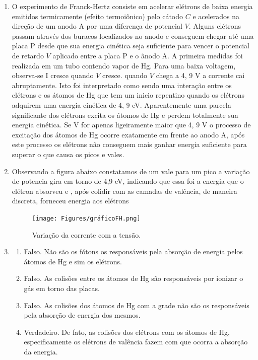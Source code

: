 \documentclass[12pt,a4paper]{article}
\begin{document}
\begin{enumerate}[label = \alph*)]
    \item O experimento de Franck-Hertz consiste em acelerar elétrons
    de baixa energia emitidos termicamente (efeito termoiônico) pelo
    cátodo $C$ e acelerados na direção de um anodo A por uma diferença de potencial $V$. Alguns elétrons passam através dos buracos
    localizados no anodo e conseguem chegar até uma placa P desde
    que sua energia cinética seja suficiente para vencer o potencial de
    retardo $V$ aplicado entre a placa P e o ânodo A. A primeira medidas foi realizada em um tubo contendo vapor de Hg. Para uma baixa voltagem, observa-se I cresce quando $V$ cresce. quando $V$ chega a 4, 9 V a corrente cai abruptamente.
    Isto foi interpretado como sendo uma interação entre os elétrons
    e os átomos de Hg que tem um inicio repentino quando os elétrons adquirem uma energia cinética de 4, 9 eV. Aparentemente
    uma parcela significante dos elétrons excita os átomos de Hg e
    perdem totalmente sua energia cinética. Se V for apenas ligeiramente maior que 4, 9 V o processo de excitação dos átomos de Hg ocorre exatamente em frente ao anodo A, após este processo os elétrons não conseguem mais ganhar energia suficiente para superar o que causa os picos e vales.
    \item Observando a figura abaixo constatamos de um vale para um pico a variação de potencia gira em torno de 4,9 eV, indicando que essa foi a energia que o elétron absorveu e , após colidir com as camadas de valência, de maneira discreta, forneceu energia aos elétrons
    \begin{figure}[h!]
        \centering
        \texttt{[image: Figures/gráficoFH.png]}
        \caption{Variação da corrente com a tensão.}
        \label{fig:fig2}
    \end{figure}
    \item 
    \begin{enumerate}
        \item Falso. Não são os fótons os responsáveis pela absorção de energia pelos átomos de Hg e sim os elétrons.

        \item Falso. As colisões entre os átomos de Hg são responsáveis por ionizar o gás em torno das placas.

        \item Falso. As colisões dos átomos de Hg com a grade não são os responsáveis pela absorção de energia dos mesmos.
        
        \item Verdadeiro. De fato, as colisões dos elétrons com os átomos de Hg, especificamente os elétrons de valência fazem com que ocorra a absorção da energia.
        

\end{enumerate}
\end{enumerate}
\end{document}

